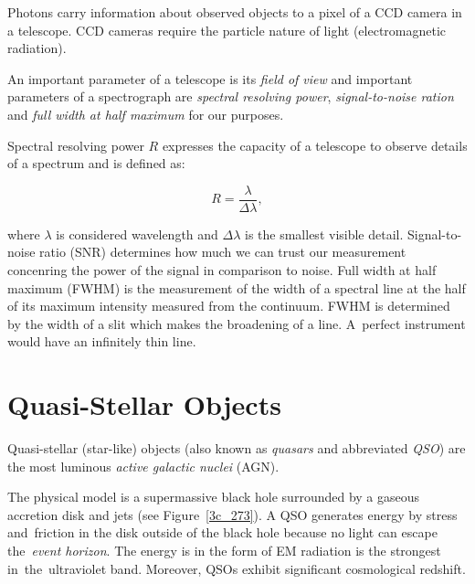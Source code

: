 Photons carry information about observed objects
to a pixel of a CCD camera in a telescope.
CCD cameras require the particle nature of light (electromagnetic radiation).~\cite{trypsteen2017}

An important parameter of a telescope is its \textit{field of view}
and important parameters of a spectrograph are \textit{spectral resolving power}, \textit{signal-to-noise ration} and \textit{full width at half maximum} for our purposes.

Spectral resolving power \(R\) expresses the capacity of a telescope to observe details of a spectrum
and is defined as:

\begin{equation}
	R = \frac{\lambda}{\Delta \lambda},
\end{equation}

where \(\lambda\) is considered wavelength
and \(\Delta \lambda\) is the smallest visible detail.
Signal-to-noise ratio (SNR) determines how much we can trust our measurement
concenring the power of the signal in comparison to noise.
Full width at half maximum (FWHM) is the measurement of the width of a spectral line at the half of its maximum intensity measured from the continuum.
FWHM is determined by the width of a slit which makes the broadening of a line.
A~perfect instrument would have an infinitely thin line.~\cite{cochard2018}

\section{Quasi-Stellar Objects}

Quasi-stellar (star-like) objects (also known as \textit{quasars} and abbreviated \textit{QSO}) are the most luminous \textit{active galactic nuclei} (AGN).~\cite{beckmann2013}

The physical model is a supermassive black hole surrounded by a gaseous accretion disk and jets (see Figure~\ref{3c_273}).
A QSO generates energy by stress and~friction in the disk outside of the black hole because no light can escape the~\textit{event horizon}.
The energy is in the form of EM radiation is the strongest in~the~ultraviolet band.
Moreover, QSOs exhibit significant cosmological redshift.


